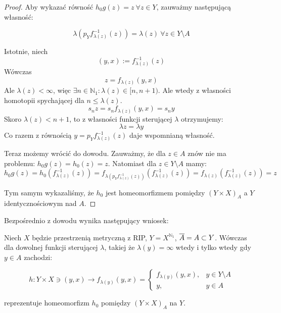 \begin{thm}
\begin{proof}
    Aby wykazać równość $h_0g(z) = z\ \forall z \in Y$, zauważmy następującą własność:
    
    $$\lambda(p_Y f_{\lambda(z)}^{-1}(z)) = \lambda(z)\ \forall z \in Y \setminus A$$
    
    Istotnie, niech
    $$(y,x) := f_{\lambda(z)}^{-1}(z)$$
    Wówczas
    $$z = f_{\lambda(z)}(y,x)$$
    Ale $\lambda(z) < \infty$, więc $\exists n \in \mathbb{N}_1: \lambda(z) \in [n, n+1)$. Ale wtedy z własności homotopii spychającej dla $n \leq \lambda(z)$.
    $$s_n z = s_n f_{\lambda(z)}(y,x) = s_n y$$
    Skoro $\lambda(z) < n+1$, to z własności funkcji sterującej $\lambda$ otrzymujemy:
    $$\lambda z = \lambda y$$
    Co razem z równością $y = p_Y f_{\lambda(z)}^{-1}(z)$ daje wspomnianą własność.
    
    Teraz możemy wrócić do dowodu. Zauważmy, że dla $z \in A$ znów nie ma problemu: $h_0g(z) = h_0(z) = z$. Natomiast dla $z \in Y \setminus A$ mamy:
    $$h_0g(z) = h_0(f_{\lambda(z)}^{-1}(z)) = f_{\lambda(p_Y f_{\lambda(z)}^{-1}(z))}(f_{\lambda(z)}^{-1}(z)) = f_{\lambda(z)}(f_{\lambda(z)}^{-1}(z)) = z$$
    
    Tym samym wykazaliśmy, że $h_0$ jest homeomorfizmem pomiędzy $(Y \times X)_A$ a $Y$ identycznościowym nad $A$.
  \end{proof}
\end{thm}


Bezpośrednio z dowodu wynika następujący wniosek:
\begin{cor}
  Niech $X$ będzie przestrzenią metryczną z RIP, $Y = X^{\mathbb{N}_1}$, $\overline{A} = A \subset Y$.
  Wówczas dla dowolnej funkcji sterującej $\lambda$, takiej że $\lambda(y) = \infty$ wtedy i tylko wtedy gdy $y \in A$ zachodzi:
  
  $$h: Y \times X \ni (y,x) \rightarrow f_{\lambda(y)}(y,x) = 
    \begin{cases}
      f_{\lambda(y)}(y,x),&y \in Y \setminus A \\
      y,&y \in A
    \end{cases}$$
  
  reprezentuje homeomorfizm $h_0$ pomiędzy $(Y \times X)_A$ na $Y$.
\end{cor}